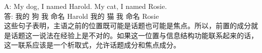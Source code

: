 \gll A: My dog, I named Harold. My cat, I named Rosie.\\
     答: 我的 狗 我 命名 Harold 我的 猫 我 命名 Rosie\\
\z
这些句子表明，主语之前的位置既可能是话题也可能是焦点。所以，前置的成分就是话题这一说法在经验上是不对的。如果这一位置与信息结构功能联系起来的话，这一联系应该是一个析取式，允许话题成分和焦点成分。

